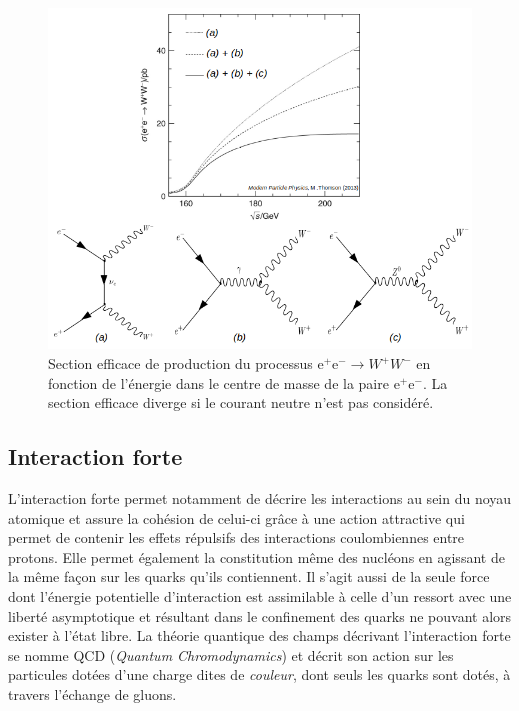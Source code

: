         \begin{figure}
        \centering
            \includegraphics[scale=0.45]{Chapitre2/Images/eescatt.png} 
            \caption{Section efficace de production du processus e$^+$e$^-\rightarrow W^+W^-$ en fonction de l'énergie dans le centre de masse de la paire e$^+$e$^-$. La section efficace diverge si le courant neutre n'est pas considéré.}
        \label{eescat}
        \end{figure}
    
        \subsection{Interaction forte}
        \label{QCD}
        
        L'interaction forte permet notamment de décrire les interactions au sein du noyau atomique et assure la cohésion de celui-ci grâce à une action attractive qui permet de contenir les effets répulsifs des interactions coulombiennes entre protons. Elle permet également la constitution même des nucléons en agissant de la même façon sur les quarks qu'ils contiennent. Il s'agit aussi de la seule force dont l'énergie potentielle d'interaction est assimilable à celle d'un ressort avec une liberté asymptotique et résultant dans le confinement des quarks ne pouvant alors exister à l'état libre. La théorie quantique des champs décrivant l'interaction forte se nomme QCD (\textit{Quantum Chromodynamics}) et décrit son action sur les particules dotées d'une charge dites de \textit{couleur}, dont seuls les quarks sont dotés, à travers l'échange de gluons. \\

